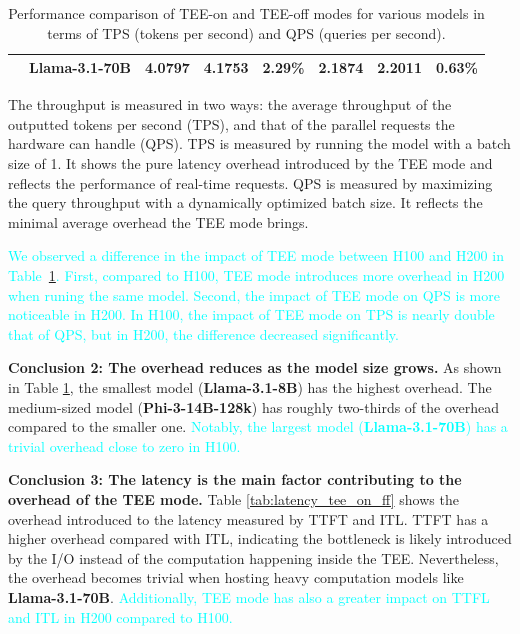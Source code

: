 \documentclass{article}
\newcommand{\peng}[1]{\textcolor{cyan}{#1}}
\begin{document}
\begin{table}[htbp]
\begin{tabular}{llccc|ccc}
        & \textbf{Llama-3.1-70B} & 4.0797                                      & 4.1753                                   & 2.29\%                                                                     & 2.1874          & 2.2011           & 0.63\% \\ 
        \bottomrule
    \end{tabular}
    \caption{Performance comparison of TEE-on and TEE-off modes for various models in terms of TPS (tokens per second) and QPS (queries per second).}
    \label{tab:throughput_tee_on_ff}
\end{table}

The throughput is measured in two ways: the average throughput of the outputted tokens per second (TPS), and that of the parallel requests the hardware can handle (QPS). TPS is measured by running the model with a batch size of 1. It shows the pure latency overhead introduced by the TEE mode and reflects the performance of real-time requests. QPS is measured by maximizing the query throughput with a dynamically optimized batch size. It reflects the minimal average overhead the TEE mode brings.

\peng{
We observed a difference in the impact of TEE mode between H100 and H200 in Table~\ref{tab:throughput_tee_on_ff}.
First, compared to H100, TEE mode introduces more overhead in H200 when runing the same model.
Second, the impact of TEE mode on QPS is more noticeable in H200.
In H100, the impact of TEE mode on TPS is nearly double that of QPS, but in H200, the difference decreased significantly.
}

\noindent\textbf{Conclusion 2: The overhead reduces as the model size grows.} As shown in Table \ref{tab:throughput_tee_on_ff}, the smallest model (\textbf{Llama-3.1-8B}) has the highest overhead. The medium-sized model (\textbf{Phi-3-14B-128k}) has roughly two-thirds of the overhead compared to the smaller one. 
\peng{Notably, the largest model (\textbf{Llama-3.1-70B}) has a trivial overhead close to zero in H100.}

\noindent\textbf{Conclusion 3: The latency is the main factor contributing to the overhead of the TEE mode.} Table \ref{tab:latency_tee_on_ff} shows the overhead introduced to the latency measured by TTFT and ITL. TTFT has a higher overhead compared with ITL, indicating the bottleneck is likely introduced by the I/O instead of the computation happening inside the TEE. Nevertheless, the overhead becomes trivial when hosting heavy computation models like \textbf{Llama-3.1-70B}.
\peng{Additionally, TEE mode has also a greater impact on TTFL and ITL in H200 compared to H100.}
\end{document}

